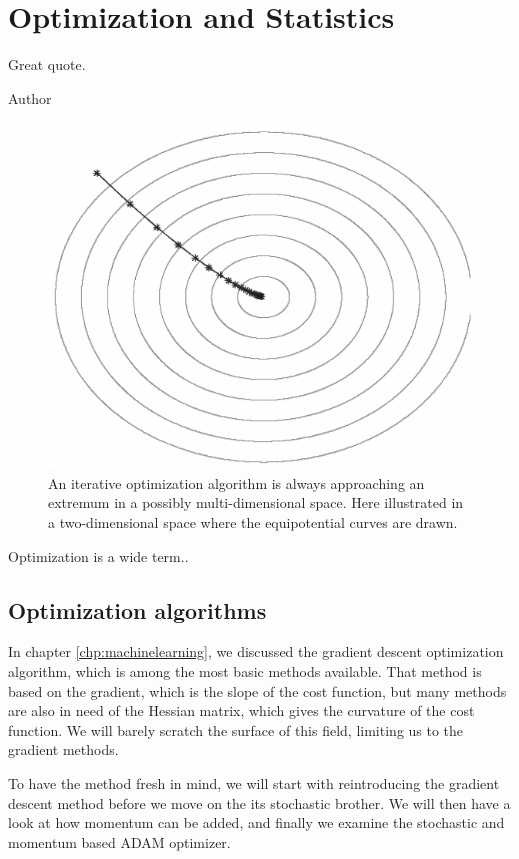 \chapter{Optimization and Statistics} \label{chp:optimization}
\epigraph{Great quote.}{Author}
\begin{figure}[H]
	\centering
	\includegraphics[scale=0.5]{Images/gd_bw.png}
	\caption{An iterative optimization algorithm is always approaching an extremum in a possibly multi-dimensional space. Here illustrated in a two-dimensional space where the equipotential curves are drawn.}
\end{figure}

Optimization is a wide term..

\newpage
\section{Optimization algorithms}
In chapter \ref{chp:machinelearning}, we discussed the gradient descent optimization algorithm, which is among the most basic methods available. That method is based on the gradient, which is the slope of the cost function, but many methods are also in need of the Hessian matrix, which gives the curvature of the cost function. We will barely scratch the surface of this field, limiting us to the gradient methods. 

To have the method fresh in mind, we will start with reintroducing the gradient descent method before we move on the its stochastic brother. We will then have a look at how momentum can be added, and finally we examine the stochastic and momentum based ADAM optimizer. 

